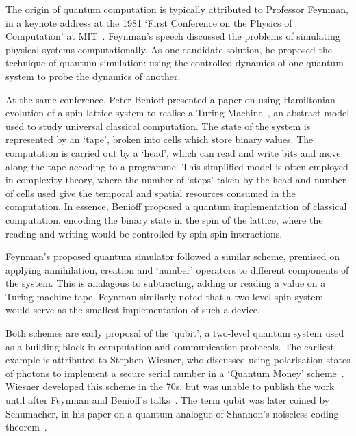 \documentclass{standalone}
\begin{document}
The origin of quantum computation is typically attributed to Professor Feynman, in a keynote address at the 1981 `First Conference on the Physics of Computation' at MIT~\cite{Feynman1982}. Feynman's speech discussed the problems of simulating physical systems computationally. As one candidate solution, he proposed the technique of quantum simulation: using the controlled dynamics of one quantum system to probe the dynamics of another. 
\par
At the same conference, Peter Benioff presented a paper on using Hamiltonian evolution of a spin-lattice system to realise a Turing Machine~\cite{Benioff1986}, an abstract model used to study universal classical computation. The state of the system is represented by an `tape', broken into cells which store binary values. The computation is carried out by a `head', which can read and write bits and move along the tape accoding to a programme. This simplified model is often employed in complexity theory, where the number of `steps' taken by the head and number of cells used give the temporal and spatial resources consumed in the computation.  In essence, Benioff proposed a quantum implementation of classical computation, encoding the binary state in the spin of the lattice, where the reading and writing would be controlled by spin-spin interactions. 
\par
Feynman's proposed quantum simulator followed a similar scheme, premised on applying annihilation, creation and `number' operators to different components of the system. This is analagous to subtracting, adding or reading a value on a Turing machine tape. Feynman similarly noted that a two-level spin system would serve as the smallest implementation of such a device. 
\par
Both schemes are early proposal of the `qubit', a two-level quantum system used as a building block in computation and communication protocols. The earliest example is attributed to Stephen Wiesner, who discussed using polarisation states of photons to implement a secure serial number in a `Quantum Money' scheme~\cite{Wiesner1983}. Wiesner developed this scheme in the 70s, but was unable to publish the work until after Feynman and Benioff's talks~\cite{Brassard2006}. The term qubit was later coined by Schumacher, in his paper on a quantum analogue of Shannon's noiseless coding theorem~\cite{Schumacher1995a}.
\end{document}
